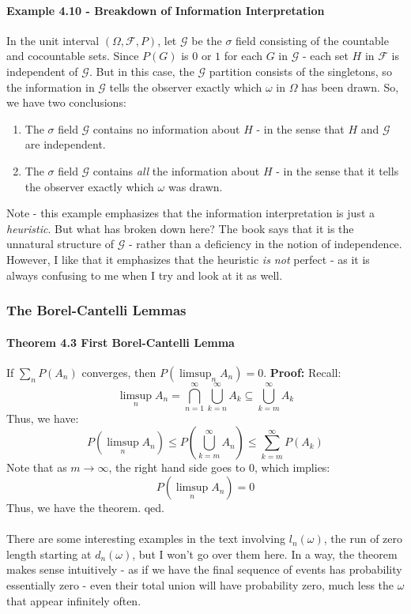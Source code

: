 \documentclass[12pt,a4paper]{article}
\newcommand{\1}[1]{\mathbbm{1}\left\{ #1 \right\}}
\newcommand{\fcal}{\mathcal{F}}
\newcommand{\gcal}{\mathcal{G}}
\begin{document}
\paragraph{Example 4.10 - Breakdown of Information Interpretation} In the unit interval $(\Omega,\fcal,P)$, let $\gcal$ be the $\sigma$ field consisting of the countable and cocountable sets. Since $P(G)$ is $0$ or $1$ for each $G$ in $\gcal$ - each set $H$ in $\fcal$ is independent of $\gcal$. But in this case, the $\gcal$ partition consists of the singletons, so the information in $\gcal$ tells the observer exactly which $\omega$ in $\Omega$ has been drawn. So, we have two conclusions:
\begin{enumerate}
	\item The $\sigma$ field $\gcal$ contains no information about $H$ - in the sense that $H$ and $\gcal$ are independent.
	\item The $\sigma$ field $\gcal$ contains \textit{all} the information about $H$ - in the sense that it tells the observer exactly which $\omega$ was drawn.
\end{enumerate}
Note - this example emphasizes that the information interpretation is just a \textit{heuristic}. But what has broken down here? The book says that it is the unnatural structure of $\gcal$ - rather than a deficiency in the notion of independence. However, I like that it emphasizes that the heuristic \textit{is not} perfect - as it is always confusing to me when I try and look at it as well.

\subsubsection{The Borel-Cantelli Lemmas}
\paragraph{Theorem 4.3 First Borel-Cantelli Lemma} If $\sum_n P(A_n)$ converges, then $P(\limsup_n A_n) = 0$.
\textbf{Proof:} Recall:
$$
	\limsup_n A_n = \bigcap_{n=1}^\infty \bigcup_{k=n}^\infty A_k \subseteq \bigcup_{k=m}^\infty A_k
$$
Thus, we have:
$$
	P\left(\limsup_n A_n\right) \leq P\left(\bigcup_{k=m}^\infty A_n \right) \leq \sum_{k=m}^\infty P(A_k)
$$
Note that as $m \to \infty$, the right hand side goes to $0$, which implies:
$$
	P\left(\limsup_n A_n\right) = 0
$$
Thus, we have the theorem. qed.
\\\\
There are some interesting examples in the text involving $l_n(\omega)$, the run of zero length starting at $d_n(\omega)$, but I won't go over them here. In a way, the theorem makes sense intuitively - as if we have the final sequence of events has probability essentially zero - even their total union will have probability zero, much less the $\omega$ that appear infinitely often.
\end{document}
